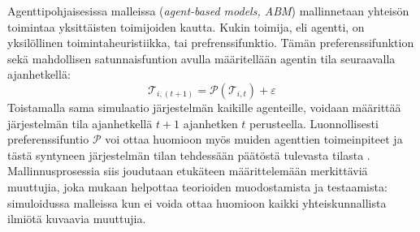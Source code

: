 \documentclass[finnish,gradu,twoside,12pt]{tktltiki}
\begin{document}
Agenttipohjaisesissa malleissa (\textit{agent-based models, ABM}) mallinnetaan yhteisön toimintaa yksittäisten toimijoiden kautta. Kukin toimija, eli agentti, on yksilöllinen toimintaheuristiikka, tai prefrenssifunktio. Tämän preferenssifunktion sekä mahdollisen satunnaisfuntion avulla määritellään agentin tila seuraavalla ajanhetkellä: \begin{equation}\mathcal{T}_{i,(t+1)} = \mathcal{P}( \mathcal{T}_{i,t} ) + \varepsilon \label{abm:yhtälö}\end{equation} Toistamalla sama simulaatio järjestelmän kaikille agenteille, voidaan määrittää järjestelmän tila ajanhetkellä $t+1$ ajanhetken $t$ perusteella. Luonnollisesti preferenssifuntio $\mathcal{P}$ voi ottaa huomioon myös muiden agenttien toimeinpiteet ja tästä syntyneen järjestelmän tilan tehdessään päätöstä tulevasta tilasta \citep[esimerkiksi][]{Bonabeau2002}.  Mallinnusprosessia siis joudutaan etukäteen määrittelemään merkittäviä muuttujia, joka \citet{Gilbert1993} mukaan helpottaa teorioiden muodostamista ja testaamista: simuloidussa malleissa kun ei voida ottaa huomioon kaikki yhteiskunnallista ilmiötä kuvaavia muuttujia.
\end{document}
